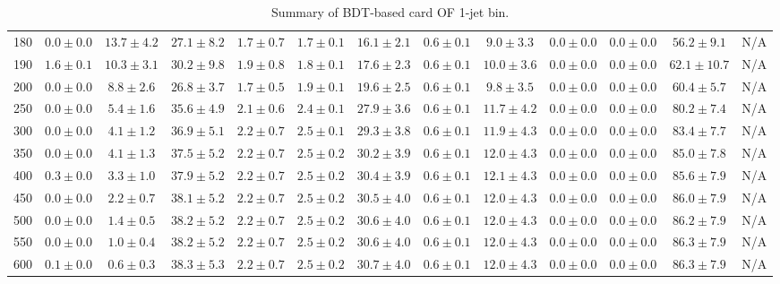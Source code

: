 \begin{table}
{\begin{center}
\begin{tabular}{l | c c | c c c c c c c c  | c c}
180 & $0.0\pm0.0$ & $13.7\pm4.2$ & $27.1\pm8.2$ & $1.7\pm0.7$ & $1.7\pm0.1$ & $16.1\pm2.1$ & $0.6\pm0.1$ & $9.0\pm3.3$ & $0.0\pm0.0$ & $0.0\pm0.0$ & $56.2\pm9.1$ &  N/A \\
190 & $1.6\pm0.1$ & $10.3\pm3.1$ & $30.2\pm9.8$ & $1.9\pm0.8$ & $1.8\pm0.1$ & $17.6\pm2.3$ & $0.6\pm0.1$ & $10.0\pm3.6$ & $0.0\pm0.0$ & $0.0\pm0.0$ & $62.1\pm10.7$ & N/A \\
200 & $0.0\pm0.0$ & $8.8\pm2.6$ & $26.8\pm3.7$ & $1.7\pm0.5$ & $1.9\pm0.1$ & $19.6\pm2.5$ & $0.6\pm0.1$ & $9.8\pm3.5$ & $0.0\pm0.0$ & $0.0\pm0.0$ & $60.4\pm5.7$ & N/A \\
250 & $0.0\pm0.0$ & $5.4\pm1.6$ & $35.6\pm4.9$ & $2.1\pm0.6$ & $2.4\pm0.1$ & $27.9\pm3.6$ & $0.6\pm0.1$ & $11.7\pm4.2$ & $0.0\pm0.0$ & $0.0\pm0.0$ & $80.2\pm7.4$ & N/A \\
300 & $0.0\pm0.0$ & $4.1\pm1.2$ & $36.9\pm5.1$ & $2.2\pm0.7$ & $2.5\pm0.1$ & $29.3\pm3.8$ & $0.6\pm0.1$ & $11.9\pm4.3$ & $0.0\pm0.0$ & $0.0\pm0.0$ & $83.4\pm7.7$ & N/A \\
350 & $0.0\pm0.0$ & $4.1\pm1.3$ & $37.5\pm5.2$ & $2.2\pm0.7$ & $2.5\pm0.2$ & $30.2\pm3.9$ & $0.6\pm0.1$ & $12.0\pm4.3$ & $0.0\pm0.0$ & $0.0\pm0.0$ & $85.0\pm7.8$ & N/A \\
400 & $0.3\pm0.0$ & $3.3\pm1.0$ & $37.9\pm5.2$ & $2.2\pm0.7$ & $2.5\pm0.2$ & $30.4\pm3.9$ & $0.6\pm0.1$ & $12.1\pm4.3$ & $0.0\pm0.0$ & $0.0\pm0.0$ & $85.6\pm7.9$ & N/A \\
450 & $0.0\pm0.0$ & $2.2\pm0.7$ & $38.1\pm5.2$ & $2.2\pm0.7$ & $2.5\pm0.2$ & $30.5\pm4.0$ & $0.6\pm0.1$ & $12.0\pm4.3$ & $0.0\pm0.0$ & $0.0\pm0.0$ & $86.0\pm7.9$ & N/A \\
500 & $0.0\pm0.0$ & $1.4\pm0.5$ & $38.2\pm5.2$ & $2.2\pm0.7$ & $2.5\pm0.2$ & $30.6\pm4.0$ & $0.6\pm0.1$ & $12.0\pm4.3$ & $0.0\pm0.0$ & $0.0\pm0.0$ & $86.2\pm7.9$ & N/A \\
550 & $0.0\pm0.0$ & $1.0\pm0.4$ & $38.2\pm5.2$ & $2.2\pm0.7$ & $2.5\pm0.2$ & $30.6\pm4.0$ & $0.6\pm0.1$ & $12.0\pm4.3$ & $0.0\pm0.0$ & $0.0\pm0.0$ & $86.3\pm7.9$ & N/A \\
600 & $0.1\pm0.0$ & $0.6\pm0.3$ & $38.3\pm5.3$ & $2.2\pm0.7$ & $2.5\pm0.2$ & $30.7\pm4.0$ & $0.6\pm0.1$ & $12.0\pm4.3$ & $0.0\pm0.0$ & $0.0\pm0.0$ & $86.3\pm7.9$ & N/A \\
\hline
\end{tabular}
\end{center}
}
\caption{Summary of BDT-based card OF 1-jet bin.}
\end{table}
